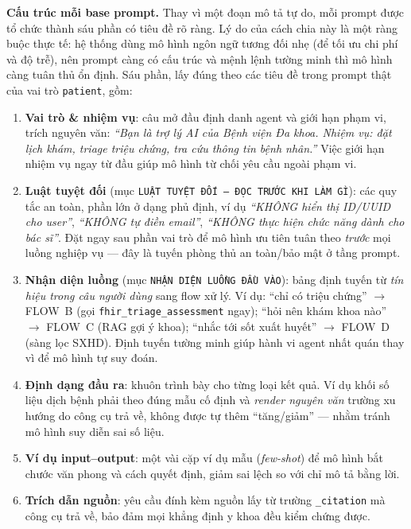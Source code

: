\documentclass[a4paper,13pt,3p,twoside,openany]{report}
\theoremstyle{definition}
\theoremstyle{remark}
\theoremstyle{definition}
\begin{document}
\textbf{Cấu trúc mỗi base prompt.} Thay vì một đoạn mô tả tự do, mỗi prompt được tổ chức thành sáu phần có tiêu đề rõ ràng. Lý do của cách chia này là một ràng buộc thực tế: hệ thống dùng mô hình ngôn ngữ tương đối nhẹ (để tối ưu chi phí và độ trễ), nên prompt càng có cấu trúc và mệnh lệnh tường minh thì mô hình càng tuân thủ ổn định. Sáu phần, lấy đúng theo các tiêu đề trong prompt thật của vai trò \texttt{patient}, gồm:

\begin{enumerate}
  \item \textbf{Vai trò \& nhiệm vụ}: câu mở đầu định danh agent và giới hạn phạm vi, trích nguyên văn: \textit{``Bạn là trợ lý AI của Bệnh viện Đa khoa. Nhiệm vụ: đặt lịch khám, triage triệu chứng, tra cứu thông tin bệnh nhân.''} Việc giới hạn nhiệm vụ ngay từ đầu giúp mô hình từ chối yêu cầu ngoài phạm vi.
  \item \textbf{Luật tuyệt đối} (mục \texttt{LUẬT TUYỆT ĐỐI --- ĐỌC TRƯỚC KHI LÀM GÌ}): các quy tắc an toàn, phần lớn ở dạng phủ định, ví dụ \textit{``KHÔNG hiển thị ID/UUID cho user''}, \textit{``KHÔNG tự điền email''}, \textit{``KHÔNG thực hiện chức năng dành cho bác sĩ''}. Đặt ngay sau phần vai trò để mô hình ưu tiên tuân theo \textit{trước} mọi luồng nghiệp vụ --- đây là tuyến phòng thủ an toàn/bảo mật ở tầng prompt.
  \item \textbf{Nhận diện luồng} (mục \texttt{NHẬN DIỆN LUỒNG ĐẦU VÀO}): bảng định tuyến từ \textit{tín hiệu trong câu người dùng} sang flow xử lý. Ví dụ: ``chỉ có triệu chứng'' $\to$ FLOW~B (gọi \texttt{fhir\_triage\_assessment} ngay); ``hỏi nên khám khoa nào'' $\to$ FLOW~C (RAG gợi ý khoa); ``nhắc tới sốt xuất huyết'' $\to$ FLOW~D (sàng lọc SXHD). Định tuyến tường minh giúp hành vi agent nhất quán thay vì để mô hình tự suy đoán.
  \item \textbf{Định dạng đầu ra}: khuôn trình bày cho từng loại kết quả. Ví dụ khối số liệu dịch bệnh phải theo đúng mẫu cố định và \textit{render nguyên văn} trường xu hướng do công cụ trả về, không được tự thêm ``tăng/giảm'' --- nhằm tránh mô hình suy diễn sai số liệu.
  \item \textbf{Ví dụ input--output}: một vài cặp ví dụ mẫu (\textit{few-shot}) để mô hình bắt chước văn phong và cách quyết định, giảm sai lệch so với chỉ mô tả bằng lời.
  \item \textbf{Trích dẫn nguồn}: yêu cầu đính kèm nguồn lấy từ trường \texttt{\_citation} mà công cụ trả về, bảo đảm mọi khẳng định y khoa đều kiểm chứng được.
\end{enumerate}
\end{document}
